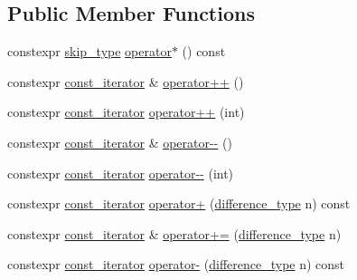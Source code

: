\subsection*{Public Member Functions}
\begin{DoxyCompactItemize}
\item 
constexpr \mbox{\hyperlink{classirk_1_1index_1_1skip__list__view_a7fa2224428803eee24062bb123978755}{skip\+\_\+type}} \mbox{\hyperlink{structirk_1_1index_1_1skip__list__view_1_1const__iterator_a986e8294e13ef860e85a3b35640806a2}{operator$\ast$}} () const
\item 
constexpr \mbox{\hyperlink{structirk_1_1index_1_1skip__list__view_1_1const__iterator}{const\+\_\+iterator}} \& \mbox{\hyperlink{structirk_1_1index_1_1skip__list__view_1_1const__iterator_a9f2eff52bff4e4193fa0f89df869a7df}{operator++}} ()
\item 
constexpr \mbox{\hyperlink{structirk_1_1index_1_1skip__list__view_1_1const__iterator}{const\+\_\+iterator}} \mbox{\hyperlink{structirk_1_1index_1_1skip__list__view_1_1const__iterator_a6f847e33643ae607c0c9275edfa69696}{operator++}} (int)
\item 
constexpr \mbox{\hyperlink{structirk_1_1index_1_1skip__list__view_1_1const__iterator}{const\+\_\+iterator}} \& \mbox{\hyperlink{structirk_1_1index_1_1skip__list__view_1_1const__iterator_a08a278c8a621e0a900e44922e05aa013}{operator-\/-\/}} ()
\item 
constexpr \mbox{\hyperlink{structirk_1_1index_1_1skip__list__view_1_1const__iterator}{const\+\_\+iterator}} \mbox{\hyperlink{structirk_1_1index_1_1skip__list__view_1_1const__iterator_a05bfba775a7a9f5036ed8d00f92e67ad}{operator-\/-\/}} (int)
\item 
constexpr \mbox{\hyperlink{structirk_1_1index_1_1skip__list__view_1_1const__iterator}{const\+\_\+iterator}} \mbox{\hyperlink{structirk_1_1index_1_1skip__list__view_1_1const__iterator_aba748a6a37aa356de30370f76d49303b}{operator+}} (\mbox{\hyperlink{structirk_1_1index_1_1skip__list__view_1_1const__iterator_afcba20bb907a231114679979015f77f5}{difference\+\_\+type}} n) const
\item 
constexpr \mbox{\hyperlink{structirk_1_1index_1_1skip__list__view_1_1const__iterator}{const\+\_\+iterator}} \& \mbox{\hyperlink{structirk_1_1index_1_1skip__list__view_1_1const__iterator_a60b3457446cc57d73b0957e193f40674}{operator+=}} (\mbox{\hyperlink{structirk_1_1index_1_1skip__list__view_1_1const__iterator_afcba20bb907a231114679979015f77f5}{difference\+\_\+type}} n)
\item 
constexpr \mbox{\hyperlink{structirk_1_1index_1_1skip__list__view_1_1const__iterator}{const\+\_\+iterator}} \mbox{\hyperlink{structirk_1_1index_1_1skip__list__view_1_1const__iterator_a68650913d3271ded33a0ee4663836ff2}{operator-\/}} (\mbox{\hyperlink{structirk_1_1index_1_1skip__list__view_1_1const__iterator_afcba20bb907a231114679979015f77f5}{difference\+\_\+type}} n) const

\end{DoxyCompactItemize}
